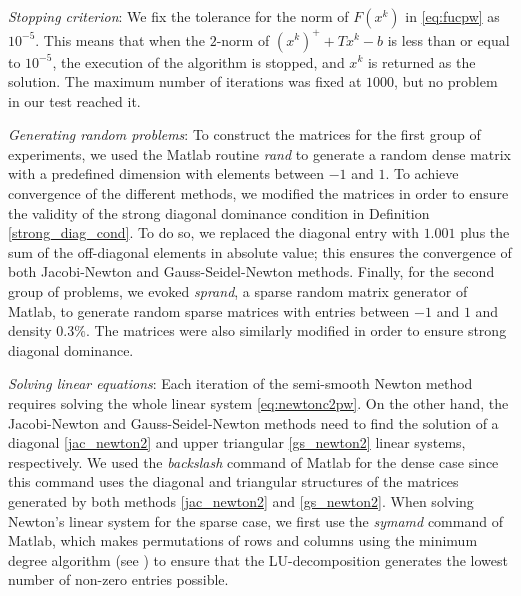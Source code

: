 \documentclass[11pt]{article}
\begin{document}
\medskip

 {\it Stopping criterion}: We fix the tolerance for the norm of $F(x^k)$ in \eqref{eq:fucpw} as $10^{-5}$. This means that when the $2$-norm of $(x^{k})^++Tx^{k}-b$ is less than or equal to $10^{-5}$, the execution of the algorithm is stopped, and $x^{k}$ is returned as the solution. The maximum number of iterations was fixed at $1000$, but no problem in our test reached it.

 \medskip

 {\it Generating random problems}: To construct the matrices for the first group of experiments, we used the Matlab routine {\it rand} to generate a random dense matrix with a predefined dimension with elements between $-1$ and $1$. To achieve convergence of the different methods, we modified the matrices in order to ensure the validity of the strong diagonal dominance condition in Definition \ref{strong_diag_cond}. To do so, we replaced the diagonal entry with $1.001$ plus the sum of the off-diagonal elements in absolute value; this ensures the convergence of both Jacobi-Newton and Gauss-Seidel-Newton methods. Finally, for the second group of problems, we evoked {\it sprand}, a sparse random matrix generator of Matlab, to generate random sparse matrices with entries between $-1$ and $1$ and density $0.3\%$. The matrices were also similarly modified in order to ensure strong diagonal dominance.

\medskip

 {\it Solving linear equations}:  Each iteration of the semi-smooth Newton method requires solving the whole linear system \eqref{eq:newtonc2pw}. On the other hand, the Jacobi-Newton and Gauss-Seidel-Newton methods need to find the solution of a diagonal \eqref{jac_newton2} and upper triangular \eqref{gs_newton2} linear systems, respectively. We used the \emph{backslash} command of Matlab for the dense case since this command uses the diagonal and triangular structures of the matrices generated by both methods \eqref{jac_newton2} and \eqref{gs_newton2}. When solving Newton's linear system for the sparse case, we first use the \emph{symamd} command of Matlab, which makes permutations of rows and columns using the minimum degree algorithm (see \cite{davis2006direct, duff2017direct}) to ensure that the LU-decomposition generates the lowest number of non-zero entries possible.  %
\end{document}
